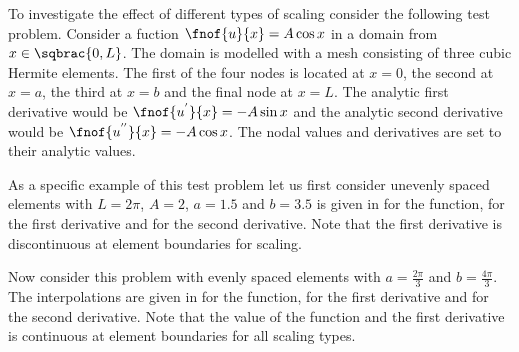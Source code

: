 To investigate the effect of different types of scaling consider the following
test problem. Consider a fuction $\fnof{u}{x}=A\cos x$ in a \oned domain from
$x\in\sqbrac{0,L}$. The domain is modelled with a mesh consisting of three
cubic Hermite elements. The first of the four nodes is located at $x=0$, the
second at $x=a$, the third at $x=b$ and the final node at $x=L$. The analytic
first derivative would be $\fnof{u^{'}}{x}=-A\sin x$ and the analytic second
derivative would be $\fnof{u^{''}}{x}=-A\cos x$. The nodal values and
derivatives are set to their analytic values.

As a specific example of this test problem let us first consider unevenly
spaced elements with $L=2\pi$, $A=2$, $a=1.5$ and
$b=3.5$ is given in  for the function,
 for the first derivative and
 for the second derivative. Note that the first
derivative is discontinuous at element boundaries for \arclen scaling.


Now consider this problem with evenly spaced elements \ie with
$a=\frac{2\pi}{3}$ and $b=\frac{4\pi}{3}$. The interpolations are given in
 for the function, 
for the first derivative and  for the second
derivative. Note that the value of the function and the first derivative is
continuous at element boundaries for all scaling types.


